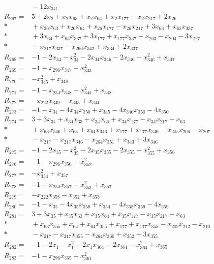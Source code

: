 \begin{align*}
&{}-12x_{341}\\[3pt]
R_{267}={}&5+2x_{2}+x_{2}x_{63}+x_{2}x_{64}+x_{2}x_{177}-x_{2}x_{217}+2x_{26}\\*
&{}+x_{26}x_{63}+x_{26}x_{64}+x_{26}x_{177}-x_{26}x_{217}+3x_{63}+x_{63}x_{337}\\*
&{}+3x_{64}+x_{64}x_{337}+3x_{177}+x_{177}x_{337}-x_{203}-x_{204}-3x_{217}\\*
&{}-x_{217}x_{337}-x_{266}x_{342}+x_{334}+2x_{337}\\[3pt]
R_{268}={}&-1-2x_{34}-x_{34}^{2}-2x_{34}x_{346}-2x_{346}-x_{346}^{2}+x_{347}\\[3pt]
R_{269}={}&-1-x_{296}x_{347}+x_{343}^{2}\\[3pt]
R_{270}={}&-x_{345}^{2}+x_{348}\\[3pt]
R_{271}={}&-1-x_{234}x_{348}+x_{344}^{2}+x_{348}\\[3pt]
R_{272}={}&-x_{222}x_{349}-x_{343}+x_{344}\\[3pt]
R_{273}={}&-1-x_{34}-4x_{34}x_{350}+x_{345}-4x_{346}x_{350}-4x_{350}\\[3pt]
R_{274}={}&3+3x_{34}+x_{34}x_{63}+x_{34}x_{64}+x_{34}x_{177}-x_{34}x_{217}+x_{63}\\*
&{}+x_{63}x_{346}+x_{64}+x_{64}x_{346}+x_{177}+x_{177}x_{346}-x_{205}x_{206}-x_{207}\\*
&{}-x_{217}-x_{217}x_{346}-x_{264}x_{351}+x_{343}+3x_{346}\\[3pt]
R_{275}={}&-1-2x_{35}-x_{35}^{2}-2x_{35}x_{355}-2x_{355}-x_{355}^{2}+x_{356}\\[3pt]
R_{276}={}&-1-x_{296}x_{356}+x_{352}^{2}\\[3pt]
R_{277}={}&-x_{354}^{2}+x_{357}\\[3pt]
R_{278}={}&-1-x_{234}x_{357}+x_{353}^{2}+x_{357}\\[3pt]
R_{279}={}&-x_{222}x_{358}-x_{352}+x_{353}\\[3pt]
R_{280}={}&-1-x_{35}-4x_{35}x_{359}+x_{354}-4x_{355}x_{359}-4x_{359}\\[3pt]
R_{281}={}&3+3x_{35}+x_{35}x_{63}+x_{35}x_{64}+x_{35}x_{177}-x_{35}x_{217}+x_{63}\\*
&{}+x_{63}x_{355}+x_{64}+x_{64}x_{355}+x_{177}+x_{177}x_{355}-x_{209}x_{212}-x_{210}\\*
&{}-x_{217}-x_{217}x_{355}-x_{264}x_{360}+x_{352}+3x_{355}\\[3pt]
R_{282}={}&-1-2x_{1}-x_{1}^{2}-2x_{1}x_{364}-2x_{364}-x_{364}^{2}+x_{365}\\[3pt]
R_{283}={}&-1-x_{296}x_{365}+x_{361}^{2}\\[3pt]

\end{align*}
